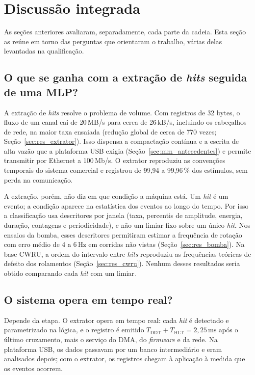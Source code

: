 \section{Discussão integrada}
\label{sec:discussao_integrada}

As seções anteriores avaliaram, separadamente, cada parte da cadeia. Esta seção as reúne em torno das perguntas que orientaram o trabalho, várias delas levantadas na qualificação.

\subsection{O que se ganha com a extração de \textit{hits} seguida de uma MLP?}

A extração de \textit{hits} resolve o problema de volume. Com registros de 32 bytes, o fluxo de um canal cai de 20\,MB/s para cerca de 26\,kB/s, incluindo os cabeçalhos de rede, na maior taxa ensaiada (redução global de cerca de 770 vezes; Seção~\ref{sec:res_extrator}). Isso dispensa a compactação contínua e a escrita de alta vazão que a plataforma USB exigia (Seção~\ref{sec:mm_antecedentes}) e permite transmitir por Ethernet a 100\,Mb/s. O extrator reproduziu as convenções temporais do sistema comercial e registrou de 99,94 a 99,96\,\% dos estímulos, sem perda na comunicação.

A extração, porém, não diz em que condição a máquina está. Um \textit{hit} é um evento; a condição aparece na estatística dos eventos ao longo do tempo. Por isso a classificação usa descritores por janela (taxa, percentis de amplitude, energia, duração, contagens e periodicidade), e não um limiar fixo sobre um único \textit{hit}. Nos ensaios da bomba, esses descritores permitiram estimar a frequência de rotação com erro médio de 4 a 6\,Hz em corridas não vistas (Seção~\ref{sec:res_bomba}). Na base CWRU, a ordem do intervalo entre \textit{hits} reproduziu as frequências teóricas de defeito dos rolamentos (Seção~\ref{sec:res_cwru}). Nenhum desses resultados seria obtido comparando cada \textit{hit} com um limiar.

\subsection{O sistema opera em tempo real?}

Depende da etapa. O extrator opera em tempo real: cada \textit{hit} é detectado e parametrizado na lógica, e o registro é emitido \(T_{\mathrm{DDT}} + T_{\mathrm{HLT}} = 2{,}25\,\mathrm{ms}\) após o último cruzamento, mais o serviço do DMA, do \textit{firmware} e da rede. Na plataforma USB, os dados passavam por um banco intermediário e eram analisados depois; com o extrator, os registros chegam à aplicação à medida que os eventos ocorrem.


